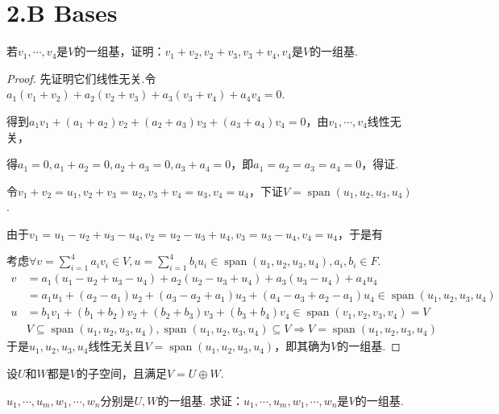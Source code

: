 \section{2.B Bases}

\begin{problem}[6]\label{2.B.6}
    若\(v_1,\cdots,v_4\)是\(V\)的一组基，证明：\(v_1+v_2,v_2+v_3,v_3+v_4,v_4\)是\(V\)的一组基.
\end{problem}

\begin{proof}
    先证明它们线性无关.令\(a_1(v_1+v_2)+a_2(v_2+v_3)+a_3(v_3+v_4)+a_4v_4=0\).

    得到\(a_1v_1+(a_1+a_2)v_2+(a_2+a_3)v_3+(a_3+a_4)v_4=0\)，由\(v_1,\cdots,v_4\)线性无关，
    
    得\(a_1=0,a_1+a_2=0,a_2+a_3=0,a_3+a_4=0\)，即\(a_1=a_2=a_3=a_4=0\)，得证.
    
    令\(v_1+v_2=u_1,v_2+v_3=u_2,v_3+v_4=u_3,v_4=u_4\)，下证\(V=\operatorname{span}(u_1,u_2,u_3,u_4)\).
    
    由于\(v_1=u_1-u_2+u_3-u_4,v_2=u_2-u_3+u_4,v_3=u_3-u_4,v_4=u_4\)，于是有
    
    考虑\(\forall v=\sum_{i=1}^4 a_iv_i \in V,u=\sum_{i=1}^4 b_iu_i \in \operatorname{span}(u_1,u_2,u_3,u_4),a_i,b_i \in F\).
    \begin{align*}
        v&=a_1(u_1-u_2+u_3-u_4)+a_2(u_2-u_3+u_4)+a_3(u_3-u_4)+a_4u_4 \\
            &=a_1u_1+(a_2-a_1)u_2+(a_3-a_2+a_1)u_3+(a_4-a_3+a_2-a_1)u_4 \in \operatorname{span}(u_1,u_2,u_3,u_4) \\
        u&=b_1v_1+(b_1+b_2)v_2+(b_2+b_3)v_3+(b_3+b_4)v_4 \in \operatorname{span}(v_1,v_2,v_3,v_4)=V \\
            & V \subseteq \operatorname{span}(u_1,u_2,u_3,u_4),\operatorname{span}(u_1,u_2,u_3,u_4)\subseteq V 
            \Rightarrow V=\operatorname{span}(u_1,u_2,u_3,u_4)
    \end{align*}
    于是\(u_1,u_2,u_3,u_4\)线性无关且\(V=\operatorname{span}(u_1,u_2,u_3,u_4)\)，即其确为\(V\)的一组基.    
\end{proof}

\begin{problem}[8]\label{2.B.8}
    设\(U\)和\(W\)都是\(V\)的子空间，且满足\(V=U \oplus W\).

    \(u_1,\cdots,u_m,w_1,\cdots,w_n\)分别是\(U,W\)的一组基.
    求证：\(u_1,\cdots,u_m,w_1,\cdots,w_n\)是\(V\)的一组基.
\end{problem}


